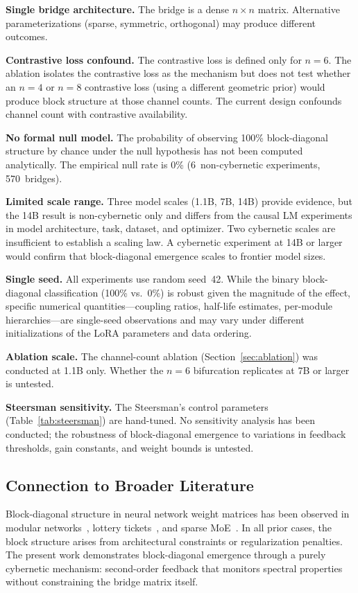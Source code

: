 \documentclass[11pt]{article}
\begin{document}
\textbf{Single bridge architecture.} The bridge is a dense
$n \times n$ matrix. Alternative parameterizations (sparse, symmetric,
orthogonal) may produce different outcomes.

\textbf{Contrastive loss confound.} The contrastive loss is defined
only for $n = 6$. The ablation isolates the contrastive loss as the
mechanism but does not test whether an $n = 4$ or $n = 8$ contrastive
loss (using a different geometric prior) would produce block structure
at those channel counts. The current design confounds channel count
with contrastive availability.

\textbf{No formal null model.} The probability of observing 100\%
block-diagonal structure by chance under the null hypothesis has not
been computed analytically. The empirical null rate is 0\%
(6~non-cybernetic experiments, 570~bridges).

\textbf{Limited scale range.} Three model scales (1.1B, 7B, 14B)
provide evidence, but the 14B result is non-cybernetic only and
differs from the causal LM experiments in model architecture, task,
dataset, and optimizer. Two cybernetic scales are insufficient to
establish a scaling law. A cybernetic experiment at 14B or larger
would confirm that block-diagonal emergence scales to frontier model
sizes.

\textbf{Single seed.} All experiments use random seed~42. While
the binary block-diagonal classification (100\% vs.\ 0\%) is robust
given the magnitude of the effect, specific numerical
quantities---coupling ratios, half-life estimates, per-module
hierarchies---are single-seed observations and may vary under
different initializations of the LoRA parameters and data ordering.

\textbf{Ablation scale.} The channel-count ablation (Section~\ref{sec:ablation}) was conducted at 1.1B
only. Whether the $n = 6$ bifurcation replicates at 7B or larger
is untested.

\textbf{Steersman sensitivity.} The Steersman's control parameters
(Table~\ref{tab:steersman}) are hand-tuned. No sensitivity analysis
has been conducted; the robustness of block-diagonal emergence to
variations in feedback thresholds, gain constants, and weight bounds
is untested.

\subsection{Connection to Broader Literature}

Block-diagonal structure in neural network weight matrices has been
observed in modular networks~\cite{clune2013}, lottery
tickets~\cite{frankle2019lottery}, and sparse
MoE~\cite{fedus2022switch}. In all prior cases, the block structure
arises from architectural constraints or regularization penalties. The
present work demonstrates block-diagonal emergence through a purely
cybernetic mechanism: second-order feedback that monitors spectral
properties without constraining the bridge matrix itself.
\end{document}
